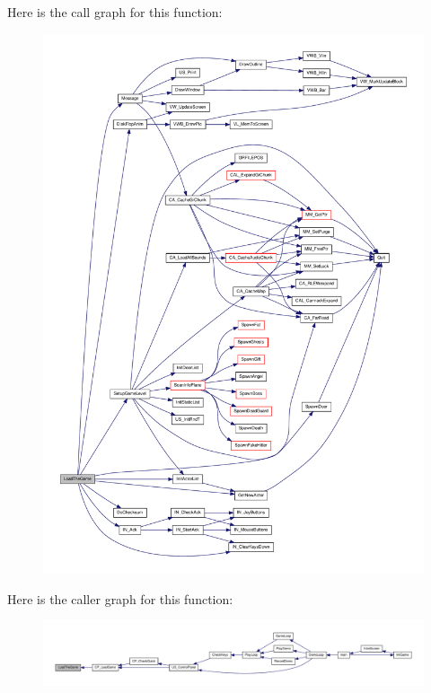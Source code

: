 Here is the call graph for this function:
\nopagebreak
\begin{figure}[H]
\begin{center}
\leavevmode
\includegraphics[width=400pt]{WL__DEF_8H_adff0b7d9c79b6ba94151102b17d7e8d2_cgraph}
\end{center}
\end{figure}




Here is the caller graph for this function:
\nopagebreak
\begin{figure}[H]
\begin{center}
\leavevmode
\includegraphics[width=400pt]{WL__DEF_8H_adff0b7d9c79b6ba94151102b17d7e8d2_icgraph}
\end{center}
\end{figure}


